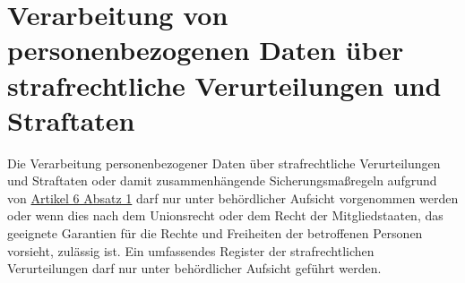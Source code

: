 \chapter{Verarbeitung von personenbezogenen Daten über strafrechtliche Verurteilungen und Straftaten}
\label{ch:10}


Die Verarbeitung personenbezogener Daten über strafrechtliche Verurteilungen und Straftaten oder damit zusammenhängende
Sicherungsmaßregeln aufgrund von \hyperref[itm:06-1]{Artikel 6 Absatz 1} darf nur unter behördlicher Aufsicht
vorgenommen werden oder wenn dies nach dem Unionsrecht oder dem Recht der Mitgliedstaaten, das geeignete Garantien für
die Rechte und Freiheiten der betroffenen Personen vorsieht, zulässig ist. Ein umfassendes Register der
strafrechtlichen Verurteilungen darf nur unter behördlicher Aufsicht geführt werden.


